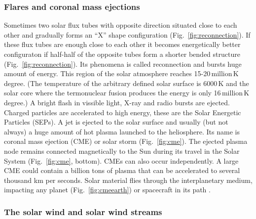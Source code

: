 \documentclass[sn-aps]{sn-jnl}%
\begin{document}
\subsubsection{Flares and coronal mass ejections}
\label{sec:cme}

Sometimes two solar flux tubes with opposite direction situated close to each other and gradually forms an ``X'' shape configuration (Fig.~\ref{fig:reconnection}). If these flux tubes are enough close to each other it becomes energetically better configuraton if half-half of the opposite tubes form a shorter bended structure (Fig.~\ref{fig:reconnection}). Its phenomena is called reconnection and bursts huge amount of energy. This region of the solar atmosphere reaches 15-20\,million\,K degree. (The temperature of the arbitrary defined solar surface is 6000\,K and the solar core where the termonuclear fusion produces the energy is only 16\,million\,K degree.) A bright flash in vissible light, X-ray and radio bursts are ejected. Charged particles are accelerated to high energy, these are the Solar Energetic Particles (SEPs). A jet is ejected to the solar surface and usually (but not always) a huge amount of hot plasma launched to the heliosphere. Its name is coronal mass ejection (CME) or solar storm (Fig.~\ref{fig:cme}). The ejected plasma node remains connected magnetically to the Sun during its travel in the Solar System (Fig.~\ref{fig:cme}, bottom). CMEs can also occur independently. A large CME could contain a billion tons of plasma that can be accelerated to several thousand km per seconds. Solar material flies through the interplanetary medium, impacting any planet (Fig.~\ref{fig:cmeearth}) or spacecraft in its path \cite{scherer05:_space_weath,stix04:_sun_introd}.

\subsubsection{The solar wind and solar wind streams}
\label{sec:sw}
\end{document}
